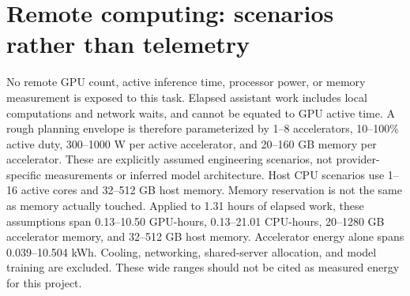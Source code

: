\documentclass[11pt]{article}
\begin{document}
\section{Remote computing: scenarios rather than telemetry}
No remote GPU count, active inference time, processor power, or memory measurement
is exposed to this task. Elapsed assistant work includes local computations and
network waits, and cannot be equated to GPU active time. A rough planning envelope
is therefore parameterized by 1--8 accelerators, 10--100\% active duty, 300--1000 W
per active accelerator, and 20--160 GB memory per accelerator. These are explicitly
assumed engineering scenarios, not provider-specific measurements or inferred
model architecture. Host CPU scenarios use 1--16 active cores and 32--512 GB host
memory. Memory reservation is not the same as memory actually touched.
Applied to 1.31 hours of elapsed work, these assumptions span 0.13--10.50 GPU-hours, 0.13--21.01 CPU-hours, 20--1280 GB accelerator memory, and 32--512 GB host memory. Accelerator energy alone spans 0.039--10.504 kWh. Cooling, networking, shared-server allocation, and model training are excluded. These wide ranges should not be cited as measured energy for this project.
\end{document}
